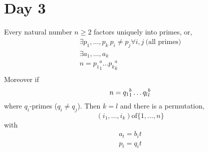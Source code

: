 \documentclass[../notes.tex]{subfiles}
\begin{document}
\section{Day 3}
\begin{theorem}
    Every natural number $n\geq 2$ factors uniquely into primes,
    or,
    \begin{align*}
        \exists p_1,\dots,p_k\ p_i\neq p_j\forall i,j\ \text{(all primes)}\\
        \exists a_1,\dots,a_k\\
        n={p_1}^a_1\dots {p_k}^a_k\\
    \end{align*}
    Moreover if
    \[
        n={q_1}^b_1\dots {q_l}^b_l\\
    \]
    where $q_i$-primes ($q_i\neq q_j$). Then
    $k=l$ and there is a permutation,
    \[
        (i_1,\dots,i_k) \text{of} \{1,\dots,n\}
    \]
    with
    \begin{align*}
        a_t=b_it\\
        p_t=q_it\\
    \end{align*}
\end{theorem}
\end{document}
